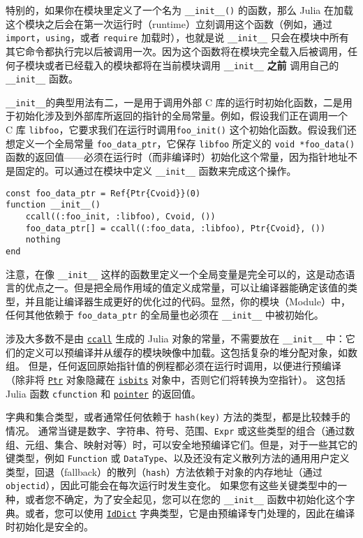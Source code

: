 特别的，如果你在模块里定义了一个名为 \texttt{\_\_init\_\_()} 的函数，那么 Julia 在加载这个模块之后会在第一次运行时（runtime）立刻调用这个函数（例如，通过 \texttt{import}，\texttt{using}，或者 \texttt{require} 加载时），也就是说 \texttt{\_\_init\_\_} 只会在模块中所有其它命令都执行完以后被调用一次。因为这个函数将在模块完全载入后被调用，任何子模块或者已经载入的模块都将在当前模块调用 \texttt{\_\_init\_\_} \textbf{之前} 调用自己的 \texttt{\_\_init\_\_} 函数。



\texttt{\_\_init\_\_}的典型用法有二，一是用于调用外部 C 库的运行时初始化函数，二是用于初始化涉及到外部库所返回的指针的全局常量。例如，假设我们正在调用一个 C 库 \texttt{libfoo}，它要求我们在运行时调用\texttt{foo\_init()} 这个初始化函数。假设我们还想定义一个全局常量 \texttt{foo\_data\_ptr}，它保存 \texttt{libfoo} 所定义的 \texttt{void *foo\_data()} 函数的返回值——必须在运行时（而非编译时）初始化这个常量，因为指针地址不是固定的。可以通过在模块中定义 \texttt{\_\_init\_\_} 函数来完成这个操作。




\begin{verbatim}
const foo_data_ptr = Ref{Ptr{Cvoid}}(0)
function __init__()
    ccall((:foo_init, :libfoo), Cvoid, ())
    foo_data_ptr[] = ccall((:foo_data, :libfoo), Ptr{Cvoid}, ())
    nothing
end
\end{verbatim}



注意，在像 \texttt{\_\_init\_\_} 这样的函数里定义一个全局变量是完全可以的，这是动态语言的优点之一。但是把全局作用域的值定义成常量，可以让编译器能确定该值的类型，并且能让编译器生成更好的优化过的代码。显然，你的模块（Module）中，任何其他依赖于 \texttt{foo\_data\_ptr} 的全局量也必须在 \texttt{\_\_init\_\_} 中被初始化。



涉及大多数不是由 \hyperlink{14245046751182637566}{\texttt{ccall}} 生成的 Julia 对象的常量，不需要放在 \texttt{\_\_init\_\_} 中：它们的定义可以预编译并从缓存的模块映像中加载。这包括复杂的堆分配对象，如数组。 但是，任何返回原始指针值的例程都必须在运行时调用，以便进行预编译（除非将 \hyperlink{10630331440513004826}{\texttt{Ptr}} 对象隐藏在 \hyperlink{12980593021531333073}{\texttt{isbits}} 对象中，否则它们将转换为空指针）。 这包括 Julia 函数 \texttt{cfunction} 和 \hyperlink{8901246211940014300}{\texttt{pointer}} 的返回值。



字典和集合类型，或者通常任何依赖于 \texttt{hash(key)} 方法的类型，都是比较棘手的情况。 通常当键是数字、字符串、符号、范围、\texttt{Expr} 或这些类型的组合（通过数组、元组、集合、映射对等）时，可以安全地预编译它们。但是，对于一些其它的键类型，例如 \texttt{Function} 或 \texttt{DataType}、以及还没有定义散列方法的通用用户定义类型，回退（fallback）的散列（\texttt{hash}）方法依赖于对象的内存地址（通过 \texttt{objectid}），因此可能会在每次运行时发生变化。 如果您有这些关键类型中的一种，或者您不确定，为了安全起见，您可以在您的 \texttt{\_\_init\_\_} 函数中初始化这个字典。或者，您可以使用 \hyperlink{14088500196255451490}{\texttt{IdDict}} 字典类型，它是由预编译专门处理的，因此在编译时初始化是安全的。



